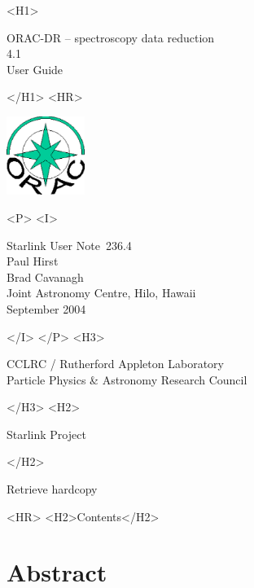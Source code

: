 \documentclass[twoside,11pt]{article}
\newcommand{\stardoccategory}  {Starlink User Note}
\newcommand{\stardocsource}    {sun\stardocnumber}
\newcommand{\stardocnumber}    {236.4}
\newcommand{\stardocauthors}   {Paul Hirst \\ Brad Cavanagh \\
                                Joint Astronomy Centre, Hilo, Hawaii}
\newcommand{\stardocdate}      {September 2004}
\newcommand{\stardoctitle}     {ORAC-DR -- spectroscopy data reduction}
\newcommand{\stardocversion}   {4.1}
\newcommand{\stardocmanual}    {User Guide}
\newcommand{\htmladdnormallink}[2]{#1}
\newcommand{\htmladdimg}[1]{}
\newcommand{\htmlref}[2]{#1}
\newcommand{\htmladdtonavigation}[1]{}
\newcommand{\xlabel}[1]{}
\renewcommand{\_}{\texttt{\symbol{95}}}
\begin{document}
\begin{htmlonly}
   \xlabel{}
   \begin{rawhtml} <H1> \end{rawhtml}
      \stardoctitle\\
      \stardocversion\\
      \stardocmanual
   \begin{rawhtml} </H1> <HR> \end{rawhtml}

\includegraphics[width=1.0in]{sun236_logo.eps}

   \begin{rawhtml} <P> <I> \end{rawhtml}
   \stardoccategory\ \stardocnumber \\
   \stardocauthors \\
   \stardocdate
   \begin{rawhtml} </I> </P> <H3> \end{rawhtml}
      \htmladdnormallink{CCLRC / Rutherford Appleton Laboratory}
                        {http://www.cclrc.ac.uk} \\
      \htmladdnormallink{Particle Physics \& Astronomy Research Council}
                        {http://www.pparc.ac.uk} \\
   \begin{rawhtml} </H3> <H2> \end{rawhtml}
      \htmladdnormallink{Starlink Project}{http://www.starlink.rl.ac.uk/}
   \begin{rawhtml} </H2> \end{rawhtml}
   \htmladdnormallink{\htmladdimg{source.gif} Retrieve hardcopy}
      {http://www.starlink.rl.ac.uk/cgi-bin/hcserver?\stardocsource}\\

  \label{stardoccontents}
  \begin{rawhtml} 
    <HR>
    <H2>Contents</H2>
  \end{rawhtml}
  \htmladdtonavigation{\htmlref{\htmladdimg{contents_motif.gif}}
        {stardoccontents}}

  \section{\xlabel{abstract}Abstract}
\end{htmlonly}
\end{document}
